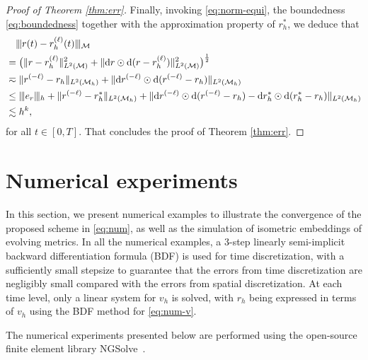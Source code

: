 \documentclass[11pt,a4paper,oneside,reqno]{amsart}
\theoremstyle{definition}
\theoremstyle{plain}
\numberwithin{theorem}{section}
\numberwithin{proposition}{section}
\numberwithin{lemma}{section}
\numberwithin{equation}{section}
\newcommand{\Man}{\mathcal{M}}
\newcommand{\normt}[1]{%
	\vert\kern-0.9pt\vert\kern-0.9pt\vert #1
	\vert\kern-0.9pt\vert\kern-0.9pt\vert}
\begin{document}
\begin{proof}[Proof of Theorem \ref{thm:err}]
Finally, invoking \eqref{eq:norm-equi}, the boundedness \eqref{eq:boundedness} together with the approximation property of $r_h^*$, we deduce that 
\[ 
\begin{aligned}
    & \quad \normt{r(t) - r_h^{(\ell)}(t) }_{\Man} \\
    &=\big(\| r - r_h^{(\ell)} \|_{L^2(\Man)}^2 + 
    \| \mathrm{d} r \odot \mathrm{d} (r - r_h^{(\ell)}) \|_{L^2(\Man)}^2\big)^{\frac{1}{2}} \\
    & \eqsim \| r^{(-\ell)} - r_h \|_{L^2(\Man_h)} 
    + \| \mathrm{d} r^{(-\ell)} \odot \mathrm{d} (r^{(-\ell)} - r_h) \|_{L^2(\Man_h)} \\ 
    & \leq\normt{e_r}_h + 
    \| r^{(-\ell)} - r_h^* \|_{L^2(\Man_h)}  + 
    \| \mathrm{d} r^{(-\ell)} \odot \mathrm{d} (r^{(-\ell)} - r_h) -\mathrm{d} r_h^* \odot \mathrm{d} (r_h^* - r_h)  \|_{L^2(\Man_h)} \\ 
    & \lesssim h^k,
\end{aligned}
\]
for all $t \in [0,T]$.
That concludes the proof of Theorem \ref{thm:err}. 
\end{proof}

\section{Numerical experiments}\label{sec:numerical}

In this section, we present numerical examples to illustrate the convergence of the proposed scheme in \eqref{eq:num}, as well as the simulation of isometric embeddings of evolving metrics. 
In all the numerical examples, a 3-step linearly semi-implicit backward differentiation formula (BDF) is used for time discretization, with a sufficiently small stepsize to guarantee that the errors from time discretization are negligibly small compared with the errors from spatial discretization. At each time level, only a linear system for  
$v_h$ is solved, with $r_h$ being expressed in terms of $v_h$ using the BDF method for \eqref{eq:num-v}. 

The numerical experiments presented below are performed using the open-source finite element library NGSolve~\cite{schoberl2014c++}.
\end{document}
